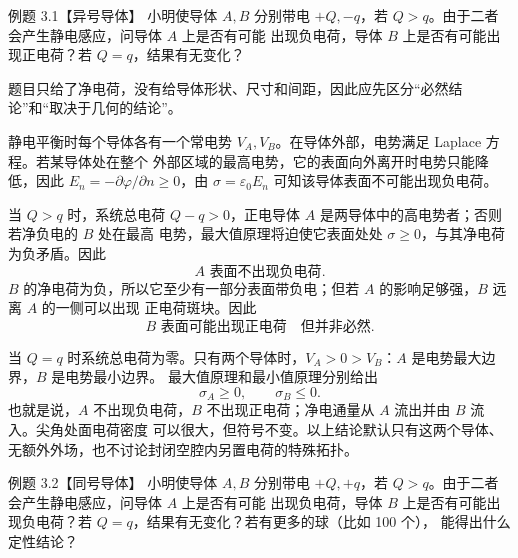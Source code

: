\begin{origexamplebox}{例题 3.1【异号导体】}
小明使导体 $A,B$ 分别带电 $+Q,-q$，若 $Q>q$。由于二者会产生静电感应，问导体 $A$ 上是否有可能
出现负电荷，导体 $B$ 上是否有可能出现正电荷？若 $Q=q$，结果有无变化？
\end{origexamplebox}

\begin{xesolution}
题目只给了净电荷，没有给导体形状、尺寸和间距，因此应先区分“必然结论”和“取决于几何的结论”。

静电平衡时每个导体各有一个常电势 $V_A,V_B$。在导体外部，电势满足 Laplace 方程。若某导体处在整个
外部区域的最高电势，它的表面向外离开时电势只能降低，因此
$E_n=-\partial\varphi/\partial n\ge0$，由 $\sigma=\varepsilon_0E_n$ 可知该导体表面不可能出现负电荷。

当 $Q>q$ 时，系统总电荷 $Q-q>0$，正电导体 $A$ 是两导体中的高电势者；否则若净负电的 $B$ 处在最高
电势，最大值原理将迫使它表面处处 $\sigma\ge0$，与其净电荷为负矛盾。因此
\[
  \boxed{A\text{ 表面不出现负电荷}}.
\]
$B$ 的净电荷为负，所以它至少有一部分表面带负电；但若 $A$ 的影响足够强，$B$ 远离 $A$ 的一侧可以出现
正电荷斑块。因此
\[
  \boxed{B\text{ 表面可能出现正电荷}\quad\text{但并非必然}}.
\]

\twoConductorPatchFigure

当 $Q=q$ 时系统总电荷为零。只有两个导体时，$V_A>0>V_B$：$A$ 是电势最大边界，$B$ 是电势最小边界。
最大值原理和最小值原理分别给出
\[
  \boxed{\sigma_A\ge0,\qquad \sigma_B\le0}.
\]
也就是说，$A$ 不出现负电荷，$B$ 不出现正电荷；净电通量从 $A$ 流出并由 $B$ 流入。尖角处面电荷密度
可以很大，但符号不变。以上结论默认只有这两个导体、无额外外场，也不讨论封闭空腔内另置电荷的特殊拓扑。
\end{xesolution}

\begin{origexamplebox}{例题 3.2【同号导体】}
小明使导体 $A,B$ 分别带电 $+Q,+q$，若 $Q>q$。由于二者会产生静电感应，问导体 $A$ 上是否有可能
出现负电荷，导体 $B$ 上是否有可能出现负电荷？若 $Q=q$，结果有无变化？若有更多的球（比如 100 个），
能得出什么定性结论？
\end{origexamplebox}


